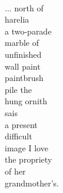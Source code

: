\documentclass[smalldemyvopaper,11pt,twoside,onecolumn,openright,extrafontsizes]{memoir}
\begin{document}
\\... north of
\\harelia
\\a two-parade
\\marble of
\\unfinished
\\wall paint
\\paintbrush
\\pile the
\\hung ornith
\\sais
\\a present
\\difficult
\\image I love
\\the propriety
\\of her
\\grandmother's.
\end{document}
